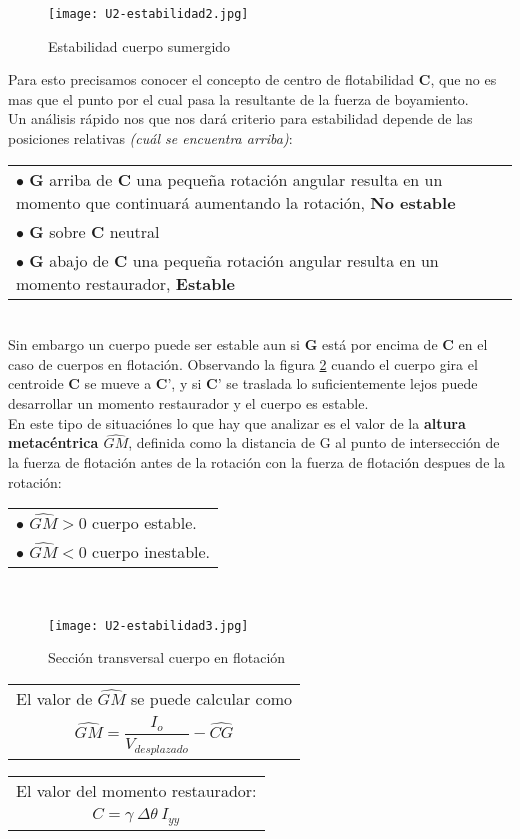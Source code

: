 \begin{figure}[!h]
	\centering
	\texttt{[image: U2-estabilidad2.jpg]}
	\caption{Estabilidad cuerpo sumergido}
	\label{fig:est-cuerp-sum}
\end{figure}


Para esto precisamos conocer el concepto de centro de flotabilidad $\textbf{C}$, que no es mas que el punto por el cual pasa la resultante de la fuerza de boyamiento.\\
Un análisis rápido nos que nos dará criterio para estabilidad depende de las posiciones relativas \textit{(cuál se encuentra arriba)}:\\
\begin{tabular}{p{\textwidth}}
	$\bullet$ $\textbf{G}$ arriba de $\textbf{C}$ una pequeña rotación angular resulta en un momento que continuará aumentando la rotación, \textbf{No estable}\\
	$\bullet$ $\textbf{G}$ sobre  $\textbf{C}$ neutral\\
	$\bullet$ $\textbf{G}$ abajo de $\textbf{C}$ una pequeña rotación angular resulta en un momento restaurador, \textbf{Estable}\\
\end{tabular}\\

Sin embargo un cuerpo puede ser estable aun si $\textbf{G}$ está por encima de $\textbf{C}$ en el caso de cuerpos en flotación. Observando la figura \ref{fig:sec-transv} cuando el cuerpo gira el centroide $\textbf{C}$ se mueve a $\textbf{C'}$, y si $\textbf{C'}$ se traslada lo suficientemente lejos puede desarrollar un momento restaurador y el cuerpo es estable.\\
En este tipo de situaciónes lo que hay que analizar es el valor de la \textbf{altura metacéntrica $\widehat{GM}$}, definida como la distancia de G al punto de intersección de la fuerza de flotación antes de la rotación con la fuerza de flotación despues de la rotación:\\
\begin{tabular}{p{\textwidth}}
	$\bullet$ $\widehat{GM}>0$ cuerpo estable.\\
	$\bullet$ $\widehat{GM}<0$ cuerpo inestable.
\end{tabular}\\
\begin{figure}[!h]
	\centering
	\texttt{[image: U2-estabilidad3.jpg]}
	\caption{Sección transversal cuerpo en flotación}
	\label{fig:sec-transv}
\end{figure}
\begin{multicols}{2}
	\begin{tabular}{c}
		El valor de $\widehat{GM}$ se puede calcular como\\
		$\widehat{GM}=\dfrac{I_{o}}{V_{desplazado}}-\widehat{CG}$\\
	\end{tabular}
	\begin{tabular}{c}
		El valor del momento restaurador:\\
		$C=\gamma~ \Delta \theta~ I_{yy}$\\
	\end{tabular}
\end{multicols}

